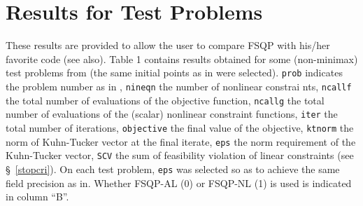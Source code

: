\section{Results for Test Problems}
\label{results}
\noindent These results are provided to allow the user to
compare FSQP with his/her favorite code (see 
also\Lspace {}\Rcitemark \Rspace{}). 
Table 1 contains results 
obtained for some (non-minimax) test problems 
from\Lspace {}\Rcitemark \Rspace{} (the same initial points
as in\Lspace {}\Rcitemark \Rspace{} were selected).
{\tt prob} indicates the problem number as in
\Rcitemark \Rspace{}, {\tt nineqn} the number of nonlinear constrai
nts,
{\tt ncallf} the total number of evaluations of the objective function,
{\tt ncallg} the total number of evaluations of the (scalar) nonlinear 
constraint functions, {\tt iter} the total number of iterations, 
{\tt objective} the final value 
of the objective, {\tt ktnorm} the norm of Kuhn-Tucker vector at the 
final iterate, {\tt eps} the norm requirement of the Kuhn-Tucker vector,
{\tt SCV} the sum of feasibility violation of linear constraints (see 
\S~\ref{stopcri}). On each test problem, {\tt eps} was selected 
so as to achieve the same
field precision as in\Lspace {}\Rcitemark \Rspace{}. 
Whether FSQP-AL (0) or FSQP-NL (1) is used is indicated in column ``B''.

